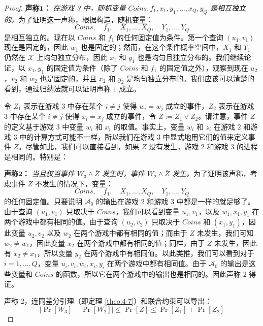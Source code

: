 \begin{proof}
\vspace{5pt}

\noindent
\textbf{声称$\mathbf{1}$：}
\emph{在游戏 3 中，随机变量 $Coins,f_1,x_1,y_1,\dots,x_Q,y_Q$ 是相互独立的。}为了证明这一声称，根据构造，随机变量：
\[
Coins,\quad
f_1,\quad
X_1,\dots,X_Q,\quad
Y_1,\dots,Y_Q
\]
是相互独立的。现在以 $Coins$ 和 $f_1$ 的任何固定值为条件。第一个查询 $(u_1,v_1)$ 现在是固定的，因此 $w_1$ 也是固定的；然而，在这个条件概率空间中，$X_1$ 和 $Y_1$ 仍然在 $\mathcal{X}$ 上均匀独立分布，因此 $x_1$ 和 $y_1$ 也是均匀且独立分布的。我们继续论证，以 $x_1,y_1$ 的固定值为条件（除了 $Coins$ 和 $f_1$ 的固定值之外），观察到现在 $u_2$，$v_2$ 和 $w_2$ 也是固定的，并且 $x_2$ 和 $y_2$ 是均匀独立分布的。我们应该可以清楚的看到，通过归纳法就可以证明声称 $1$ 成立。

令 $Z_1$ 表示在游戏 $3$ 中存在某个 $i\neq j$ 使得 $w_i=w_j$ 成立的事件，$Z_2$ 表示在游戏 $3$ 中存在某个 $i\neq j$ 使得 $x_i=x_j$ 成立的事件，令 $Z:=Z_1\lor Z_2$。请注意，事件 $Z$ 的定义基于游戏 $3$ 中变量 $w_i$ 和 $x_i$ 的取值。事实上，变量 $w_i$ 和 $z_i$ 在游戏 $2$ 和游戏 $3$ 中的计算方式可能不一样，所以我们在游戏 $3$ 中显式地用它们的值来定义事件 $Z$。尽管如此，我们可以直接看到，如果 $Z$ 没有发生，游戏 $2$ 和游戏 $3$ 的进程是相同的。特别是：

\vspace{5pt}

\noindent
\textbf{声称$\mathbf{2}$：}
\emph{当且仅当事件 $W_3\land\bar Z$ 发生时，事件 $W_2\land\bar Z$ 发生。}为了证明该声称，考虑事件 $Z$ 不发生的情况下，变量：
\[
Coins,\quad
f_1,\quad
X_1,\dots,X_Q,\quad
Y_1,\dots,Y_Q
\]
的任何固定值。只要说明 $\mathcal{A}_0$ 的输出在游戏 $2$ 和游戏 $3$ 中都是一样的就足够了。由于查询 $(u_1,v_1)$ 只取决于 $Coins$，我们可以看到变量 $u_1,v_1$，以及 $w_1,x_1,y_1$ 在两个游戏中都有相同的值。由于查询 $(u_2,v_2)$ 只取决于 $Coins$ 和 $(x_1,y_1)$，因此变量 $u_2,v_2$ 以及 $w_2$ 在两个游戏中都有相同的值；而由于 $Z$ 未发生，我们可知 $w_2\neq w_1$，因此变量 $x_2$ 在两个游戏中都有相同的值；同样，由于 $Z$ 未发生，因此有 $x_2\neq x_1$，所以变量 $y_2$ 在两个游戏中有相同值。以此类推，我们可以看到对于 $i=1,\dots,Q$，变量 $u_i,v_i,w_i,x_i,y_i$ 在两个游戏中都有相同值。由于 $\mathcal{A}_0$ 的输出是这些变量和 $Coins$ 的函数，所以它在两个游戏中的输出也是相同的。因此声称 $2$ 得证。

声称 $2$，连同差分引理（即定理 \ref{theo:4-7}）和联合约束可以导出：
\begin{equation}\label{eq:4-27}
|\Pr[W_3]-\Pr[W_2]|\leq\Pr[Z]\leq\Pr[Z_1]+\Pr[Z_2]
\end{equation}


\end{proof}
